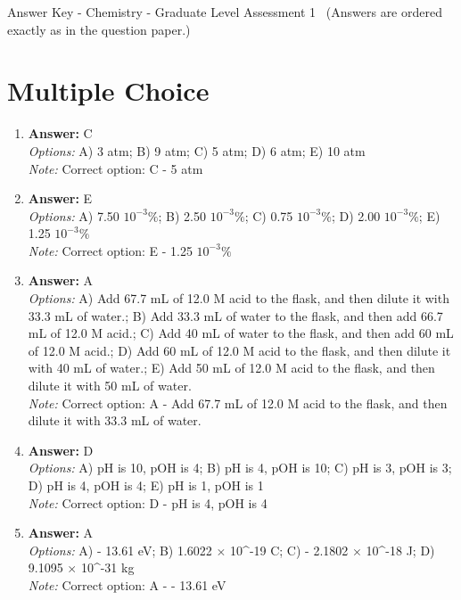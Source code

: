 \documentclass[12pt]{article}
\begin{document}
\begin{center}
Answer Key - Chemistry - Graduate Level Assessment 1 \
\small (Answers are ordered exactly as in the question paper.)
\end{center}

\section*{Multiple Choice}
\begin{enumerate}[label=\arabic*.]
\item \textbf{Answer:} C
\\ \textit{Options:} A) 3 atm; B) 9 atm; C) 5 atm; D) 6 atm; E) 10 atm
\\ \textit{Note:} Correct option: C - 5 atm
\item \textbf{Answer:} E
\\ \textit{Options:} A) 7.50 $10^{-3} \%$; B) 2.50 $10^{-3} \%$; C) 0.75 $10^{-3} \%$; D) 2.00 $10^{-3} \%$; E) 1.25 $10^{-3} \%$
\\ \textit{Note:} Correct option: E - 1.25 $10^{-3} \%$
\item \textbf{Answer:} A
\\ \textit{Options:} A) Add 67.7 mL of 12.0 M acid to the flask, and then dilute it with 33.3 mL of water.; B) Add 33.3 mL of water to the flask, and then add 66.7 mL of 12.0 M acid.; C) Add 40 mL of water to the flask, and then add 60 mL of 12.0 M acid.; D) Add 60 mL of 12.0 M acid to the flask, and then dilute it with 40 mL of water.; E) Add 50 mL of 12.0 M acid to the flask, and then dilute it with 50 mL of water.
\\ \textit{Note:} Correct option: A - Add 67.7 mL of 12.0 M acid to the flask, and then dilute it with 33.3 mL of water.
\item \textbf{Answer:} D
\\ \textit{Options:} A) pH is 10, pOH is 4; B) pH is 4, pOH is 10; C) pH is 3, pOH is 3; D) pH is 4, pOH is 4; E) pH is 1, pOH is 1
\\ \textit{Note:} Correct option: D - pH is 4, pOH is 4
\item \textbf{Answer:} A
\\ \textit{Options:} A) - 13.61 eV; B) 1.6022 \ensuremath{\times} 10^-19 C; C) - 2.1802 \ensuremath{\times} 10^-18 J; D) 9.1095 \ensuremath{\times} 10^-31 kg
\\ \textit{Note:} Correct option: A - - 13.61 eV
\end{enumerate}
\end{document}
